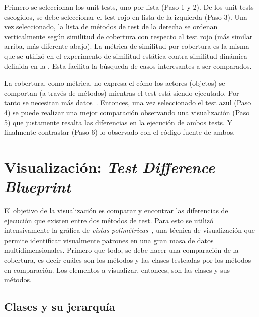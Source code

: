 \par Primero se seleccionan los unit tests, uno por lista (Paso 1 y 2). De los unit tests escogidos, se debe seleccionar el test rojo en lista de la izquierda (Paso 3). Una vez seleccionado, la lista de métodos de test de la derecha se ordenan verticalmente según similitud de cobertura con respecto al test rojo (más similar arriba, más diferente abajo). La métrica de similitud por cobertura es la misma que se utilizó en el experimento de similitud estática contra similitud dinámica definida en la . Esta facilita la búsqueda de casos interesantes a ser comparados. 

\par La cobertura, como métrica, no expresa el cómo los actores (objetos) se comportan (a través de métodos) mientras el test está siendo ejecutado. Por tanto se necesitan más datos~\cite{van2001refactoring,greiler2012test}. Entonces, una vez seleccionado el test azul (Paso 4) se puede realizar una mejor comparación observando una visualización (Paso 5) que justamente resalta las diferencias en la ejecución de ambos tests. Y finalmente contrastar (Paso 6) lo observado con el código fuente de ambos.



\section{Visualización: \emph{Test Difference Blueprint}}

\par El objetivo de la visualización es comparar y encontrar las diferencias de ejecución que existen entre dos métodos de test. Para esto se utilizó intensivamente la gráfica de \emph{vistas polimétricas}~\cite{Lanz03d}, una técnica de visualización que permite identificar visualmente patrones en una gran masa de datos multidimensionales. Primero que todo, se debe hacer una comparación de la cobertura, es decir cuáles son los métodos y las clases testeadas por los métodos en comparación. Los elementos a visualizar, entonces, son las clases y sus métodos. 

\subsection{Clases y su jerarquía}

